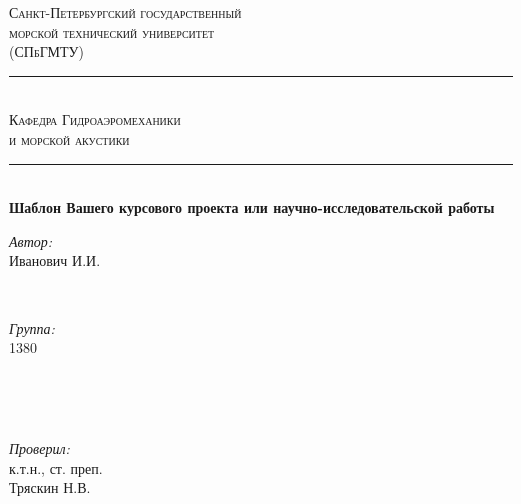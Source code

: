 \documentclass[11pt]{article}
\begin{document}
\begin{titlepage}

\newcommand{\HRule}{\rule{\linewidth}{0.2mm}} %

\center %
 
\textsc{Санкт-Петербургский государственный\\морской технический университет\\(СПбГМТУ)}\\ %

\HRule\\[0.5cm]
\textsc{\Large Кафедра Гидроаэромеханики\\и морской акустики}\\[0.5cm] %
\HRule\\[1cm]


\huge{\bfseries{Шаблон Вашего курсового проекта или научно-исследовательской работы}}\\[1.5cm] %
 

\begin{minipage}{0.4\textwidth}
\begin{flushleft} \large
\emph{Автор:}\\
Иванович \textsc{И.И.} \\  %
\end{flushleft}
\end{minipage}
~
\begin{minipage}{0.4\textwidth}
\begin{flushright} \large
\emph{Группа:} \\
1380  \\ %
\end{flushright}
\end{minipage}\\[2cm]
 
\begin{minipage}{0.4\textwidth}
\begin{flushleft} \large
\end{flushleft}
\end{minipage}
~ 
\begin{minipage}{0.4\textwidth}
\begin{flushright} \large
\emph{Проверил:} \\
к.т.н., ст. преп.\\
Тряскин \textsc{Н.В.} 
\end{flushright}
\end{minipage}\\[2cm] 
 


\end{titlepage}
\end{document}
